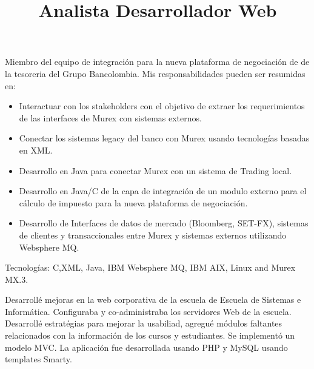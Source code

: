 \begin{resume}
\title{\textbf{Analista} }
\begin{position}
Miembro del equipo de integraci\'{o}n para la nueva plataforma de negociaci\'{o}n de
de la tesoreria del Grupo Bancolombia. Mis responsabilidades pueden ser resumidas en:
\begin{itemize}
\item {Interactuar con los stakeholders con el objetivo de extraer los requerimientos de las interfaces de Murex con sistemas externos.}
\item {Conectar los sistemas legacy del banco con Murex usando tecnolog\'{i}as basadas en XML.}
\item {Desarrollo en Java para conectar Murex con un sistema de Trading local.}
\item {Desarrollo en Java/C de la capa de integraci\'{o}n de un modulo   externo para el c\'{a}lculo de impuesto para la nueva plataforma de
  negociaci\'{o}n.}
\item {Desarrollo de Interfaces de datos de mercado (Bloomberg, SET-FX),   sistemas de clientes y transaccionales entre Murex y sistemas externos
  utilizando Websphere MQ.} 
\end{itemize}

Tecnolog\'{i}as: C,XML, Java, IBM  Websphere MQ, IBM AIX, Linux and Murex MX.3.
\end{position}

\title{\textbf{Desarrollador Web} }
\begin{position}
Desarroll\'{e} mejoras en la web corporativa de la escuela de Escuela
de Sistemas e Inform\'{a}tica. Configuraba y  co-administraba los
servidores Web de la escuela. Desarroll\'{e} estrat\'{e}gias para
mejorar la usabiliad, agregu\'{e} m\'{o}dulos faltantes relacionados
con la informaci\'{o}n de los cursos y estudiantes. Se implement\'{o}
un modelo MVC. La aplicaci\'{o}n fue desarrollada usando PHP y
MySQL usando templates Smarty.
\end{position}


\end{resume}
